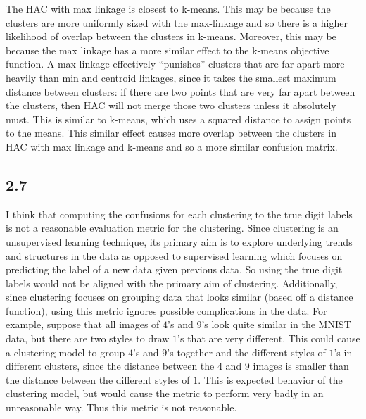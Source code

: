 \documentclass[submit]{harvardml}
\begin{document}
The HAC with max linkage is closest to k-means. This may be because the clusters are more uniformly sized with the max-linkage and so there is a higher likelihood of overlap between the clusters in k-means. Moreover, this may be because the max linkage has a more similar effect to the k-means objective function. A max linkage effectively ``punishes'' clusters that are far apart more heavily than min and centroid linkages, since it takes the smallest maximum distance between clusters: if there are two points that are very far apart between the clusters, then HAC will not merge those two clusters unless it absolutely must. This is similar to k-means, which uses a squared distance to assign points to the means. This similar effect causes more overlap between the clusters in HAC with max linkage and k-means and so a more similar confusion matrix.

\newpage
\subsection*{2.7}

I think that computing the confusions for each clustering to the true digit labels is not a reasonable evaluation metric for the clustering. Since clustering is an unsupervised learning technique, its primary aim is to explore underlying trends and structures in the data as opposed to supervised learning which focuses on predicting the label of a new data given previous data. So using the true digit labels would not be aligned with the primary aim of clustering. Additionally, since clustering focuses on grouping data that looks similar (based off a distance function), using this metric ignores possible complications in the data. For example, suppose that all images of $4$'s and $9$'s look quite similar in the MNIST data, but there are two styles to draw $1$'s that are very different. This could cause a clustering model to group $4$'s and $9$'s together and the different styles of $1$'s in different clusters, since the distance between the $4$ and $9$ images is smaller than the distance between the different styles of $1$. This is expected behavior of the clustering model, but would cause the metric to perform very badly in an unreasonable way. Thus this metric is not reasonable.


\newpage
\end{document}
